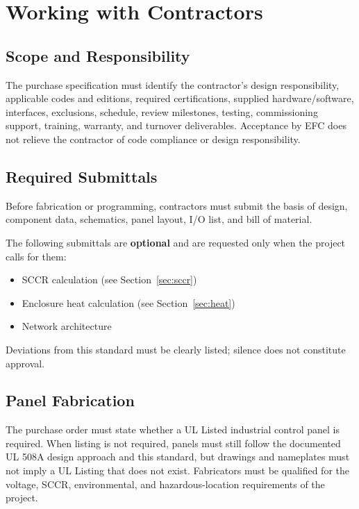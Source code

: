 \chapter{Working with Contractors}
\section{Scope and Responsibility}
The purchase specification must identify the contractor's design responsibility, applicable codes and editions, required certifications, supplied hardware/software, interfaces, exclusions, schedule, review milestones, testing, commissioning support, training, warranty, and turnover deliverables. Acceptance by EFC does not relieve the contractor of code compliance or design responsibility.

\section{Required Submittals}
Before fabrication or programming, contractors must submit the basis of design, component data, schematics, panel layout, I/O list, and bill of material.

The following submittals are \textbf{optional} and are requested only when the project calls for them:
\begin{itemize}[itemsep=1pt]
  \item SCCR calculation (see Section~\ref{sec:sccr})
  \item Enclosure heat calculation (see Section~\ref{sec:heat})
  \item Network architecture
\end{itemize}
Deviations from this standard must be clearly listed; silence does not constitute approval.

\section{Panel Fabrication}
The purchase order must state whether a UL Listed industrial control panel is required. When listing is not required, panels must still follow the documented UL 508A design approach and this standard, but drawings and nameplates must not imply a UL Listing that does not exist. Fabricators must be qualified for the voltage, SCCR, environmental, and hazardous-location requirements of the project.
